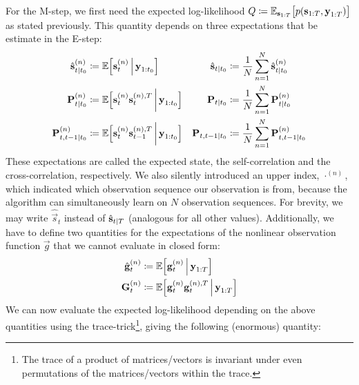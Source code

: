 	For the M-step, we first need the expected log-likelihood \( Q \coloneqq \mathbb{E}_{\boldsymbol{\mathrm{s}}_{1:T}}\big[ p(\boldsymbol{\mathrm{s}}_{1:T}, \boldsymbol{\mathrm{y}}_{1:T}) \big] \) as stated previously. This quantity depends on three expectations that be estimate in the E-step:
	\begin{align}
		\hat{\boldsymbol{\mathrm{s}}}_{t \vert t_0}^{(n)}  &\coloneqq \mathbb{E}\Big[\boldsymbol{\mathrm{s}}_t^{(n)} \,\Big\vert\, \boldsymbol{\mathrm{y}}_{1:t_0}\Big]                             & \hat{\boldsymbol{\mathrm{s}}}_{t \vert t_0}           & \coloneqq \frac{1}{N} \sum_{n = 1}^{N} \hat{\boldsymbol{\mathrm{s}}}_{t \vert t_0}^{(n)}  \label{eq:stateSmoothed} \\
		\boldsymbol{\mathrm{P}}_{t \vert t_0}^{(n)}        &\coloneqq \mathbb{E}\Big[\boldsymbol{\mathrm{s}}_t^{(n)} \boldsymbol{\mathrm{s}}_t^{(n), T} \,\bigg\vert\, \boldsymbol{\mathrm{y}}_{1:t_0}\Big]       & \boldsymbol{\mathrm{P}}_{t \vert t_0}        & \coloneqq \frac{1}{N} \sum_{n = 1}^{N} \boldsymbol{\mathrm{P}}_{t \vert t_0}^{(n)}  \label{eq:selfCorrelation} \\
		\boldsymbol{\mathrm{P}}_{t, t - 1 \vert t_0}^{(n)} &\coloneqq \mathbb{E}\Big[\boldsymbol{\mathrm{s}}_t^{(n)} \boldsymbol{\mathrm{s}}_{t - 1}^{(n), T} \,\bigg\vert\, \boldsymbol{\mathrm{y}}_{1:t_0}\Big] & \boldsymbol{\mathrm{P}}_{t, t - 1 \vert t_0} & \coloneqq \frac{1}{N} \sum_{n = 1}^{N} \boldsymbol{\mathrm{P}}_{t, t - 1 \vert t_0}^{(n)}  \label{eq:crossCorrelation}
	\end{align}
	These expectations are called the expected state, the self-correlation and the cross-correlation, respectively. We also silently introduced an upper index, \( \cdot^{(n)} \), which indicated which observation sequence our observation is from, because the algorithm can simultaneously learn on \(N\) observation sequences. For brevity, we may write \( \hat{\vec{s}}_t \) instead of \( \hat{\boldsymbol{\mathrm{s}}}_{t \vert T} \) (analogous for all other values). Additionally, we have to define two quantities for the expectations of the nonlinear observation function \( \vec{g} \) that we cannot evaluate in closed form:
	\begin{align}
		\hat{\boldsymbol{\mathrm{g}}}_t^{(n)} &\coloneqq \mathbb{E}\Big[\boldsymbol{\mathrm{g}}_t^{(n)} \,\Big\vert\, \boldsymbol{\mathrm{y}}_{1:T}\Big]  \label{eq:expectedMeasurement} \\
		\boldsymbol{\mathrm{G}}_t^{(n)}       &\coloneqq \mathbb{E}\Big[\boldsymbol{\mathrm{g}}_t^{(n)} \boldsymbol{\mathrm{g}}_t^{(n), T} \,\Big\vert\, \boldsymbol{\mathrm{y}}_{1:T}\Big]  \label{eq:expectedMeasurementMat}
	\end{align}
	We can now evaluate the expected log-likelihood depending on the above quantities using the trace-trick\footnote{The trace of a product of matrices/vectors is invariant under even permutations of the matrices/vectors within the trace.}, giving the following (enormous) quantity:
